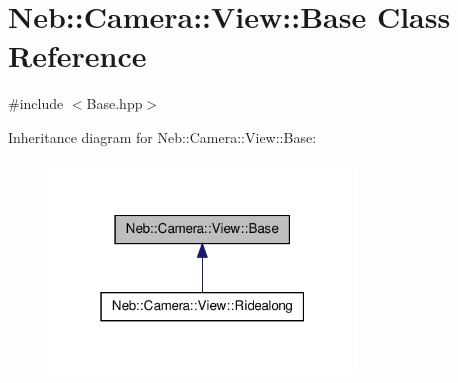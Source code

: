 \hypertarget{classNeb_1_1Camera_1_1View_1_1Base}{\section{\-Neb\-:\-:\-Camera\-:\-:\-View\-:\-:\-Base \-Class \-Reference}
\label{classNeb_1_1Camera_1_1View_1_1Base}
}


 




{\ttfamily \#include $<$\-Base.\-hpp$>$}



\-Inheritance diagram for \-Neb\-:\-:\-Camera\-:\-:\-View\-:\-:\-Base\-:
\nopagebreak
\begin{figure}[H]
\begin{center}
\leavevmode
\includegraphics[width=232pt]{classNeb_1_1Camera_1_1View_1_1Base__inherit__graph}
\end{center}
\end{figure}
